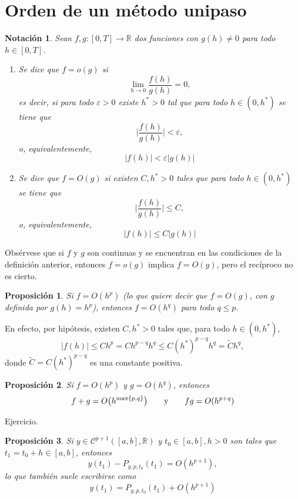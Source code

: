 \documentclass[11pt]{report}
\makeatletter
\renewenvironment{proof}[1][\proofname]{\par
  \pushQED{\qed}%
  \normalfont \topsep\z@skip %
  \trivlist
  \item[\hskip\labelsep
        \itshape
    #1\@addpunct{.}]\ignorespaces
}{%
  \popQED\endtrivlist\@endpefalse
}
\theoremstyle{mytheorem}
\newtheorem{proposition}{Proposición}
\theoremstyle{mydefinition}
\theoremstyle{myexample}
\newtheorem*{notation}{Notación}
\let\oldproofname=\proofname
\renewcommand{\proofname}{\rm\bf{\oldproofname}}}
\newenvironment{cproposition} %
  {\begin{mdframed}[
        linewidth=3pt,
        linecolor=c2,
        bottomline=false,
        topline=false,
        rightline=false,
        innerrightmargin=0pt,
        innertopmargin=0pt,
        innerbottommargin=0pt,
        innerleftmargin=1em, %
        skipabove=\baselineskip]
    \begin{proposition}}
  {\end{proposition}\end{mdframed}}
\newcommand{\R}{\mathbb R}
\makeatother
\begin{document}
\section{Orden de un método unipaso}

\begin{notation}
Sean $f,g \colon [0,T] \to \R$ dos funciones con $g(h) \neq 0$ para todo $h \in [0,T]$.
\begin{enumerate}
    \item Se dice que $f = o(g)$ si
    \[\lim_{h \to 0} \frac{f(h)}{g(h)} = 0,\]
    es decir, si para todo $\varepsilon>0$ existe $h^*>0$ tal que para todo $h \in (0,h^*)$ se tiene que
    \[\bigl|\frac{f(h)}{g(h)}\bigr| < \varepsilon,\]
    o, equivalentemente,
    \[|f(h)| < \varepsilon|g(h)| \]
    \item Se dice que $f = O(g)$ si existen $C,h^* >0$ tales que para todo $h \in (0,h^*)$ se tiene que
    \[\bigl|\frac{f(h)}{g(h)}\bigr| \leq C,\]
    o, equivalentemente,
    \[|f(h)| \leq C|g(h)|\]
\end{enumerate}
\end{notation}

Obsérvese que si $f$ y $g$ son continuas y se encuentran en las condiciones de la definición anterior, entonces $f= o(g)$ implica $f = O(g)$, pero el recíproco no es cierto.

\begin{cproposition}
Si $f = O(h^p)$ (lo que quiere decir que $ f= O(g)$, con $g$ definida por $g(h) = h^p$), entonces $f=O(h^q)$ para todo $q \leq p$.
\end{cproposition}

\begin{proof}
En efecto, por hipótesis, existen $C,h^*>0$ tales que, para todo $h \in (0,h^*)$,
\[|f(h)| \leq Ch^p = Ch^{p-q}h^q \leq C(h^*)^{p-q}h^q = \tilde{C}h^q,\]
donde $\tilde{C} = C(h^*)^{p-q}$ es una constante positiva.
\end{proof}

\begin{cproposition}
Si $f = O(h^p)$ y $g = O(h^q)$, entonces \[f+g = O\bigl(h^{\max \{p,q\}}\bigr) \qquad \textup{y} \qquad fg = O(h^{p+q})\]
\end{cproposition}

\begin{proof}
    Ejercicio.
\end{proof}

\begin{cproposition}
\label{prop3}
Si $y \in \mathcal{C}^{p+1}([a,b],\R)$ y $t_0 \in [a,b], h>0$ son tales que $t_1 = t_0+h \in [a,b]$, entonces
\[y(t_1)-P_{y,p,t_0}(t_1) = O(h^{p+1}),\]
lo que también suele escribirse como
\[y(t_1)=P_{y,p,t_0}(t_1) +O(h^{p+1})\]
\end{cproposition}
\end{document}

